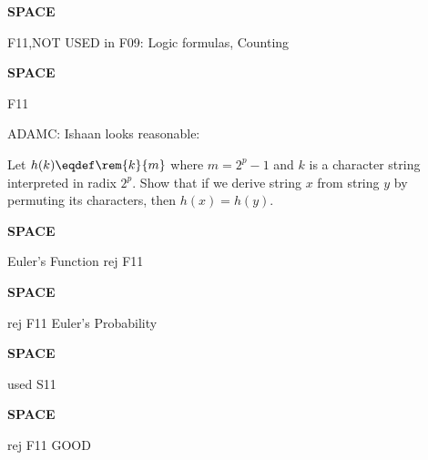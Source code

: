 \documentclass[quiz]{mcs}
\renewcommand{\examspace}{\textbf{SPACE}\newline}
\begin{document}
\examspace
\begin{editingnotes}F11,NOT USED in F09: Logic formulas, Counting\end{editingnotes}


\iffalse
\examspace
\begin{editingnotes}F11\end{editingnotes}

\pinput[points = 6, title =
  \textbf{infinite binary sequences}]{FP_infinite_binary_sequences}
\fi

\examspace
\begin{editingnotes}F11

ADAMC: Ishaan looks reasonable:

Let $h(k) \eqdef \rem{k}{m}$ where $m = 2^p - 1$ and $k$ is a
character string interpreted in radix $2^p$.  Show that if we derive
string $x$ from string $y$ by permuting its characters, then $h(x) =
h(y)$.
\end{editingnotes}


\examspace  
\begin{editingnotes}Euler's Function rej F11\end{editingnotes}

\examspace  
\begin{editingnotes}rej F11 Euler's Probability\end{editingnotes}

\iffalse
\examspace
\begin{editingnotes}F11\end{editingnotes}

\pinput[points = 7, title =
  \textbf{directed graphs and probability}]{FP_directed_graphs_and_probability}
\fi

\examspace 
\begin{editingnotes}used S11\end{editingnotes}



\examspace
\begin{editingnotes}rej F11 GOOD \end{editingnotes}
\end{document}
